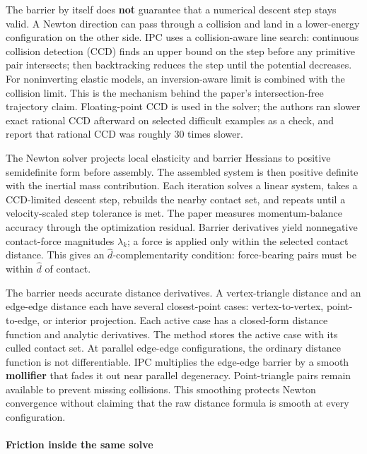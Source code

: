 The barrier by itself does \textbf{not} guarantee that a numerical descent step stays valid. A Newton direction can pass through a collision and land in a lower-energy configuration on the other side. IPC uses a collision-aware line search: continuous collision detection (CCD) finds an upper bound on the step before any primitive pair intersects; then backtracking reduces the step until the potential decreases. For noninverting elastic models, an inversion-aware limit is combined with the collision limit. This is the mechanism behind the paper's intersection-free trajectory claim. Floating-point CCD is used in the solver; the authors ran slower exact rational CCD afterward on selected difficult examples as a check, and report that rational CCD was roughly 30 times slower.

The Newton solver projects local elasticity and barrier Hessians to positive semidefinite form before assembly. The assembled system is then positive definite with the inertial mass contribution. Each iteration solves a linear system, takes a CCD-limited descent step, rebuilds the nearby contact set, and repeats until a velocity-scaled step tolerance is met. The paper measures momentum-balance accuracy through the optimization residual. Barrier derivatives yield nonnegative contact-force magnitudes \(\lambda_k\); a force is applied only within the selected contact distance. This gives an \(\widehat d\)-complementarity condition: force-bearing pairs must be within \(\widehat d\) of contact.

The barrier needs accurate distance derivatives. A vertex-triangle distance and an edge-edge distance each have several closest-point cases: vertex-to-vertex, point-to-edge, or interior projection. Each active case has a closed-form distance function and analytic derivatives. The method stores the active case with its culled contact set. At parallel edge-edge configurations, the ordinary distance function is not differentiable. IPC multiplies the edge-edge barrier by a smooth \textbf{mollifier} that fades it out near parallel degeneracy. Point-triangle pairs remain available to prevent missing collisions. This smoothing protects Newton convergence without claiming that the raw distance formula is smooth at every configuration.

\paragraph{Friction inside the same solve}\label{friction-inside-the-same-solve}

